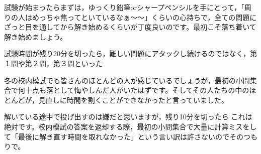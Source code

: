 \documentclass[b5j,7.5pt,twoside,twocolumn]{tetsujsarticle}
\begin{document}
試験が始まったらまずは，ゆっくり鉛筆orシャープペンシルを手にとって，「周りの人はめっちゃ焦ってといているなぁ〜〜」くらいの心持ちで，全ての問題にざっと目を通してから解き始めるくらいが丁度良いのです。最初こそ落ち着いて解き始めましょう。

%
%
%
%
%
%
%
%
%
%
%

試験時間が残り20分を切ったら，難しい問題にアタックし続けるのではなく，第１問や第２問，第３問といった

冬の校内模試でも皆さんのほとんどの人が感じているでしょうが，最初の小問集合で何十点も落として悔やしんだ人がいたはずです。そしてその人たちの中のほとんどが，見直しに時間を割くことができなかったと言っていました。

解いている途中で投げ出すのは嫌だと思いますが，残り10分を切ったら これは絶対です。校内模試の答案を返却する際，最初の小問集合で大量に計算ミスをして「最後に解き直す時間を取れなかった」という言い訳は許さないのでそのつもりで。
\end{document}
